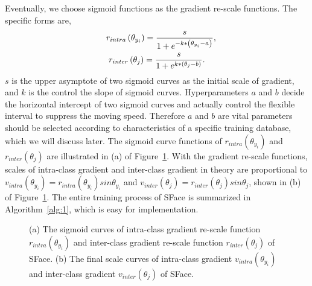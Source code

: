 \documentclass[journal,comsoc]{IEEEtran}
\begin{document}
Eventually, we choose sigmoid functions as the gradient re-scale functions. The specific forms are,
\begin{equation}
\label{equa:rescale}
\begin{gathered}
\quad{r_{intra}}\left( {{\theta _{{y_i}}}} \right) = \frac{s}{{1 + {e^{ - k*\left( {{\theta _{{y_i}}} - a} \right)}}}}, \hfill \\
{r_{inter}}\left( {{\theta _j}} \right) = \frac{s}{{1 + {e^{k*\left( {{\theta _{j}} - b} \right)}}}}.
\end{gathered}
\end{equation}$s$ is the upper asymptote of two sigmoid curves as the initial scale of gradient, and $k$ is the control the slope of sigmoid curves. Hyperparameters $a$ and $b$ decide the horizontal intercept of two sigmoid curves and actually control the flexible interval to suppress the moving speed. Therefore $a$ and $b$ are vital parameters should be selected according to characteristics of a specific training database, which we will discuss later. The sigmoid curve functions of ${r_{intra}}\left( {{\theta _{{y_i}}}} \right)$ and ${r_{inter}}\left( {{\theta _j}} \right)$ are illustrated in (a) of Figure~\ref{fig:method_curve}. With the gradient re-scale functions, scales of intra-class gradient and inter-class gradient in theory are proportional to ${v_{intra}}\left( {{\theta _{{y_i}}}} \right)={r_{intra}}\left( {{\theta _{{y_i}}}} \right)sin\theta_{y_i}$ and ${v_{inter}}\left( {{\theta _j}} \right)={r_{inter}}\left( {{\theta _j}} \right)sin\theta_j$, shown in (b) of Figure~\ref{fig:method_curve}. The entire training process of SFace is summarized in Algorithm~\ref{alg:1}, which is easy for implementation.

\begin{figure}[htbp]
	\centering

\caption{(a) The sigmoid curves of intra-class gradient re-scale function ${r_{intra}}\left( {{\theta _{{y_i}}}} \right)$ and inter-class gradient re-scale function ${r_{inter}}\left( {{\theta _j}} \right)$ of SFace. (b) The final scale curves of intra-class gradient ${v_{intra}}\left( {{\theta _{{y_i}}}} \right)$ and inter-class gradient ${v_{inter}}\left( {{\theta _j}} \right)$ of SFace.}
\label{fig:method_curve}
\end{figure}
\end{document}
